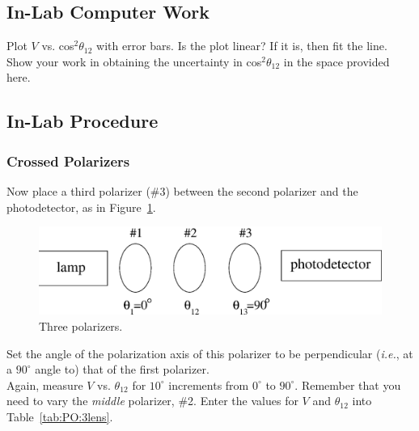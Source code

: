 \subsection{In-Lab Computer Work}
Plot $V$ vs. cos$^2\theta_{12}$ with error bars.  Is the plot linear?  If it is, then 
fit the line.  Show your work in obtaining the uncertainty in cos$^2\theta_{12}$ in the space provided here. \\
\vspace*{2.5cm}

\subsection{In-Lab Procedure}
\subsubsection{Crossed Polarizers}
\label{sec:pol:crosspol}

Now place a third polarizer (\#3) between the second polarizer and 
the photodetector, as in Figure~\ref{fig:pol:threepol}.  
\begin{figure}[htb]
\centering 
\epsfxsize=9cm \includegraphics[scale=0.6]{7_polarization/threepol.eps}
\caption{Three polarizers.}
\label{fig:pol:threepol}
\end{figure}
Set the angle of the polarization axis of this polarizer to be perpendicular 
({\it i.e.}, at a $90^\circ$ angle to) that of the first polarizer.  \\

\noindent 
Again, 
measure $V$ vs.
$\theta_{12}$ for $10^\circ$ increments from $0^\circ$ to $90^\circ$.  
Remember that you need to vary the {\it middle} polarizer, \#2.
Enter the values for $V$ and $\theta_{12}$ into Table~\ref{tab:PO:3lens}.
 
